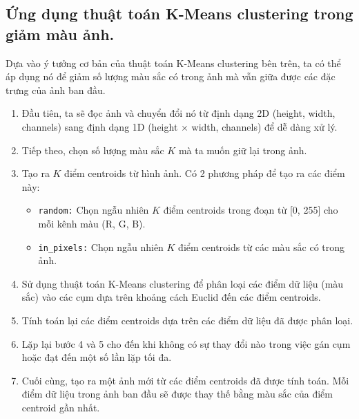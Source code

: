 \subsection{Ứng dụng thuật toán K-Means clustering trong giảm màu ảnh.}

Dựa vào ý tưởng cơ bản của thuật toán K-Means clustering bên trên, ta có thể áp dụng nó để giảm số lượng màu sắc có trong ảnh mà vẫn giữa được các đặc trưng của ảnh ban đầu.

\begin{enumerate}
	\item Đầu tiên, ta sẽ đọc ảnh và chuyển đổi nó từ định dạng 2D (height, width, channels) sang định dạng 1D (height $\times$ width, channels) để dễ dàng xử lý.
	\item Tiếp theo, chọn số lượng màu sắc $K$ mà ta muốn giữ lại trong ảnh.
	\item Tạo ra $K$ điểm centroids từ hình ảnh. Có 2 phương pháp để tạo ra các điểm này:
	      \begin{itemize}
		      \item \texttt{random:} Chọn ngẫu nhiên $K$ điểm centroids trong đoạn từ [0, 255] cho mỗi kênh màu (R, G, B).
		      \item \texttt{in\_pixels:} Chọn ngẫu nhiên $K$ điểm centroids từ các màu sắc có trong ảnh.
	      \end{itemize}
	\item Sử dụng thuật toán K-Means clustering để phân loại các điểm dữ liệu (màu sắc) vào các cụm dựa trên khoảng cách Euclid đến các điểm centroids.
	\item Tính toán lại các điểm centroids dựa trên các điểm dữ liệu đã được phân loại.
	\item Lặp lại bước 4 và 5 cho đến khi không có sự thay đổi nào trong việc gán cụm hoặc đạt đến một số lần lặp tối đa.
	\item Cuối cùng, tạo ra một ảnh mới từ các điểm centroids đã được tính toán. Mỗi điểm dữ liệu trong ảnh ban đầu sẽ được thay thế bằng màu sắc của điểm centroid gần nhất.
\end{enumerate}